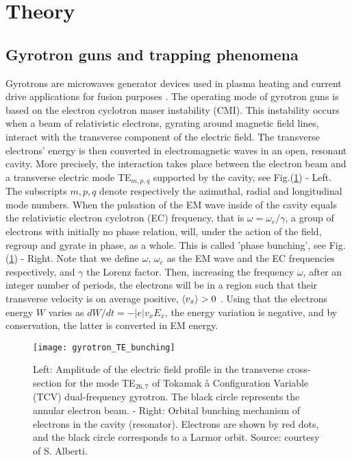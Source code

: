 \section{Theory}\label{Theory}
\subsection{Gyrotron guns and trapping phenomena}\label{Section_gyrotron}


Gyrotrons are microwaves generator devices used in plasma heating and current drive applications for fusion purposes \cite{Pagonakis}. The operating mode of gyrotron guns is based on the electron cyclotron maser instability (CMI). This instability occurs when a beam of relativistic electrons, gyrating around magnetic field lines, interact with the transverse component of the electric field. The transverse electrons' energy is then converted in electromagnetic waves in an open, resonant cavity. More precisely, the interaction takes place between the electron beam and a transverse electric mode TE$_{m,p,q}$ supported by the cavity, see Fig.(\ref{modes}) - Left. The subscripts $m,p,q$ denote respectively the azimuthal, radial and longitudinal mode numbers. When the pulsation of the EM wave inside of the cavity equals the relativistic electron cyclotron (EC) frequency, that is $\omega = \omega_e/\gamma$, a group of electrons with initially no phase relation, will, under the action of the field, regroup and gyrate in phase, as a whole. This is called 'phase bunching', see Fig.(\ref{modes}) - Right. Note that we define $\omega$, $\omega_e$ as the EM wave and the EC frequencies respectively, and $\gamma$ the Lorenz factor.  Then, increasing the frequency $\omega$, after an integer number of periods, the electrons will be in a region such that their transverse velocity is on average positive, $\braket{v_x} > 0$ \cite{AlbertiThesis}. Using that the electrons energy $W$ varies as $dW/dt = -|e|v_xE_x$, the energy variation is negative, and by conservation, the latter is converted in EM energy.\\

\begin{figure}[h!]
\centering
	\texttt{[image: gyrotron\_TE\_bunching]}
	\caption{\label{modes}Left: Amplitude of the electric field profile in the transverse cross-section for the mode TE$_{26,7}$ of Tokamak à Configuration Variable (TCV) dual-frequency gyrotron.  \cite{GenoudThesis} The black circle represents the annular electron beam. - Right:  Orbital bunching mechanism of electrons in the cavity (resonator). Electrons are shown by red dots, and the black circle corresponds to a Larmor orbit. Source: courtesy of S. Alberti.}
\end{figure}  

